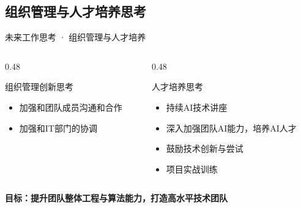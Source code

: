 \documentclass[aspectratio=169,11pt]{beamer}
\begin{document}
\subsection{组织管理与人才培养思考}
\begin{frame}{未来工作思考 · 组织管理与人才培养}
    \begin{columns}[T]
        \begin{column}{0.48\textwidth}
            \begin{block}{组织管理创新思考}
                \begin{itemize}
                    \item 加强和团队成员沟通和合作
                    \item 加强和IT部门的协调
                \end{itemize}
            \end{block}
        \end{column}
        \begin{column}{0.48\textwidth}
            \begin{block}{人才培养思考}
                \begin{itemize}
                    \item 持续AI技术讲座
                    \item 深入加强团队AI能力，培养AI人才
                    \item 鼓励技术创新与尝试
                    \item 项目实战训练
                \end{itemize}
            \end{block}
        \end{column}
    \end{columns}
    
    \vspace{0.3cm}
    
    \begin{center}
        \colorbox{cmccgreen!20}{
            \textbf{目标：提升团队整体工程与算法能力，打造高水平技术团队}
        }
    \end{center}
\end{frame}
\end{document}
